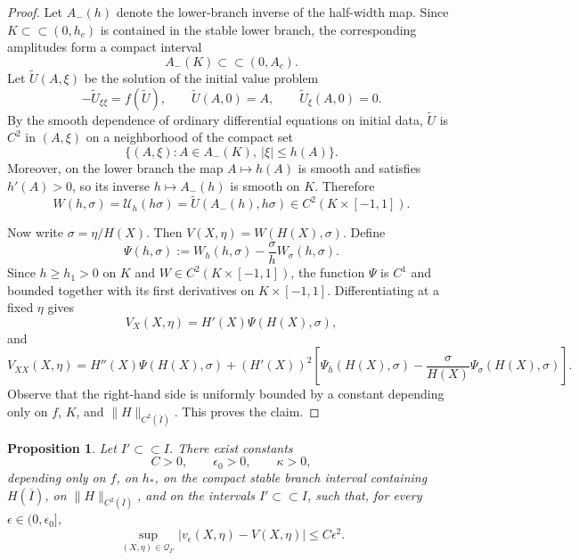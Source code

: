 \documentclass[reqno,12pt]{amsart}
\numberwithin{equation}{section}
\newtheorem{proposition}[theorem]{Proposition}
\theoremstyle{remark}
\begin{document}
\begin{proof}
Let $A_-(h)$ denote the lower-branch inverse of the half-width map. Since
$K\subset\subset(0,h_c)$ is contained in the stable lower branch, the corresponding amplitudes form a compact interval
$$
A_-(K)\subset\subset(0,A_c).
$$
Let $\widetilde U(A,\xi)$ be the solution of the initial value problem
$$
-\widetilde U_{\xi\xi}=f(\widetilde U),
\qquad
\widetilde U(A,0)=A,
\qquad
\widetilde U_\xi(A,0)=0.
$$
By the smooth dependence of ordinary differential equations on initial data,
$\widetilde U$ is $C^2$ in $(A,\xi)$ on a neighborhood of the compact set
$$
\{(A,\xi):A\in A_-(K),\ |\xi|\le h(A)\}.
$$
Moreover, on the lower branch the map $A\mapsto h(A)$ is smooth and satisfies
$h'(A)>0$, so its inverse $h\mapsto A_-(h)$ is smooth on $K$. Therefore
$$
W(h,\sigma) = \mathcal U_h(h\sigma) 
= \widetilde U(A_-(h),h\sigma)  \in C^2(K\times[-1,1]).
$$


Now write $\sigma= {\eta}/{H(X)}.$
Then
$V(X,\eta)=W(H(X),\sigma).$
Define
$$
\Psi(h,\sigma):=W_h(h,\sigma)-\frac{\sigma}{h}W_\sigma(h,\sigma).
$$
Since $h\ge h_1>0$ on $K$ and $W\in C^2(K\times[-1,1])$, the function $\Psi$ is $C^1$ and bounded together with its first derivatives on $K\times[-1,1]$. Differentiating at a fixed  $\eta$ gives
$$
V_X(X,\eta)=H'(X)\Psi(H(X),\sigma),
$$
and
$$
V_{XX}(X,\eta)
=
H''(X)\Psi(H(X),\sigma)
+
(H'(X))^2
\left[
\Psi_h(H(X),\sigma)
- \frac{\sigma}{H(X)}\Psi_\sigma(H(X),\sigma)
\right].
$$
Observe that the right-hand side is uniformly bounded by a constant depending only on
$f$, $K$, and $\|H\|_{C^2(\overline I)}$. This proves the claim.
\end{proof}


\begin{proposition}\label{prop:c0-approx}
Let $I'\subset\subset I$.  There exist constants
$$
C>0,
\qquad
\epsilon_0>0,
\qquad
\kappa>0,
$$
depending only on $f$, on $h_*$, on the compact stable branch interval
containing $H(\overline I)$, on $\|H\|_{C^2(\overline I)}$, and on the
intervals $I'\subset\subset I$, such that, for every $\epsilon\in(0,\epsilon_0]$,
$$
\sup_{(X,\eta)\in\mathcal Q_{I'}}
|v_\epsilon(X,\eta)-V(X,\eta)|
\le C\epsilon^2.
$$
\end{proposition}
\end{document}
